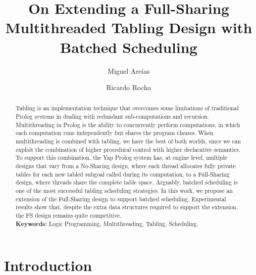 \documentclass{llncs}
\begin{document}
\title{On Extending a Full-Sharing Multithreaded Tabling Design with
  Batched Scheduling}

\author{Miguel Areias \and Ricardo Rocha}


\maketitle


\begin{abstract}
Tabling is an implementation technique that overcomes some limitations
of traditional Prolog systems in dealing with redundant
sub-computations and recursion. Multithreading in Prolog is the
ability to concurrently perform computations, in which each
computation runs independently but shares the program clauses. When
multithreading is combined with tabling, we have the best of both
worlds, since we can exploit the combination of higher procedural
control with higher declarative semantics. To support this
combination, the Yap Prolog system has, at engine level, multiple
designs that vary from a No-Sharing design, where each thread
allocates fully private tables for each new tabled subgoal called
during its computation, to a Full-Sharing design, where threads share
the complete table space. Arguably, batched scheduling is one of the
most successful tabling scheduling strategies. In this work, we
propose an extension of the Full-Sharing design to support batched
scheduling. Experimental results show that, despite the extra data
structures required to support the extension, the FS design remains
quite competitive.\\

\textbf{Keywords:} Logic Programming, Multithreading, Tabling, Scheduling.
\end{abstract}


\section{Introduction}
\end{document}
